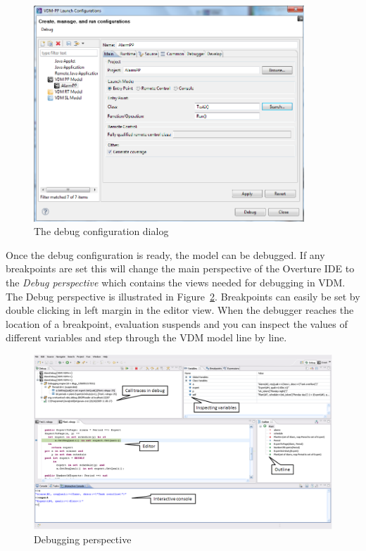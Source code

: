 \begin{figure}[htp]
\begin{center}
  \includegraphics[width=4in]{figures/DebugConfiguration}
  \caption{The debug configuration dialog}
  \label{fig:debugConfiguration}
\end{center}
\end{figure}

Once the debug configuration is ready, the model can be debugged. If
any breakpoints are set this
will change the main perspective of the Overture IDE to the
\emph{Debug perspective} which contains the views needed for debugging
in VDM. The Debug perspective is illustrated in Figure~\ref{fig:DebuggingVDM}. 
Breakpoints can easily be set by double clicking in left
margin in the editor view. When the debugger reaches the location of a
breakpoint, evaluation suspends and you can inspect the values of
different variables and step through the VDM model line by line.
 

\begin{figure}[htp]
\begin{center}
  \includegraphics[width=5in]{figures/DebuggingVDM}
  \caption[Debugging perspective]{Debugging perspective}
  \label{fig:DebuggingVDM}
\end{center}
\end{figure}

